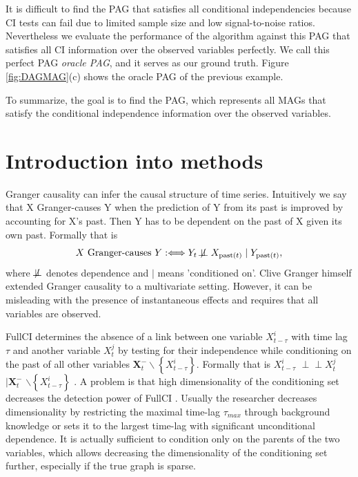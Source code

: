 \documentclass[conference]{IEEEtran}
\begin{document}
It is difficult to find the PAG that satisfies all conditional independencies because CI tests can fail due to limited sample size and low signal-to-noise ratios.
Nevertheless we evaluate the performance of the algorithm against this PAG that satisfies all CI information over the observed variables perfectly. We call this perfect PAG \textit{oracle PAG}, and it serves as our ground truth.
Figure \ref{fig:DAGMAG}(c) shows the oracle PAG of the previous example. 

To summarize, the goal is to find the PAG, which represents all MAGs that satisfy the conditional independence information over the observed variables.


\section{Introduction into methods}

Granger causality can infer the causal structure of time series. Intuitively we say that X Granger-causes Y when the prediction of Y from its past is improved by accounting for X's past.
Then Y has to be dependent on the past of X given its own past. Formally that is
\begin{equation}
X \text { Granger-causes } Y: \Longleftrightarrow Y_{t} \not\!\perp\!\!\!\perp X_{\operatorname{past}(t)}  \mid Y_{\operatorname{past}(t)},
\end{equation}\cite{peters_elements_2018} where $\not\!\perp\!\!\!\perp$ denotes dependence and $|$ means 'conditioned on'.
Clive Granger himself extended Granger causality to a multivariate setting\cite{granger_testing_1980}. However, it can be misleading with the presence of instantaneous effects \cite{granger_clive_recent_1988} and requires that all variables are observed\cite{granger_testing_1980}.

FullCI determines the absence of a link between one variable $X_{t-\tau}^{i}$ with time lag $\tau$ and another variable $X_{t}^{j}$ by testing for their independence while conditioning on the past of all other variables $\mathbf{X}_{t}^{-} \backslash\left\{X_{t-\tau}^{i}\right\}$. 
Formally that is
$X_{t-\tau}^{i} $
$\!\perp\!\!\!\perp X_{t}^{j} $
$\mid \mathbf{X}_{t}^{-}$
$ \backslash\left\{X_{t-\tau}^{i}\right\}$ \cite{runge_pcmci_2019}.
A problem is that high dimensionality of the conditioning set decreases the detection power of FullCI \cite{runge_pcmci_2019}.
Usually the researcher decreases dimensionality by restricting the maximal time-lag $\tau_{max}$ through background knowledge or sets it to the largest time-lag with significant unconditional dependence\cite{runge_pcmci_2019}.
It is actually sufficient to condition only on the parents of the two variables\cite{pearl_causality_2000}, which allows decreasing the dimensionality of the conditioning set further, especially if the true graph is sparse.
\end{document}

